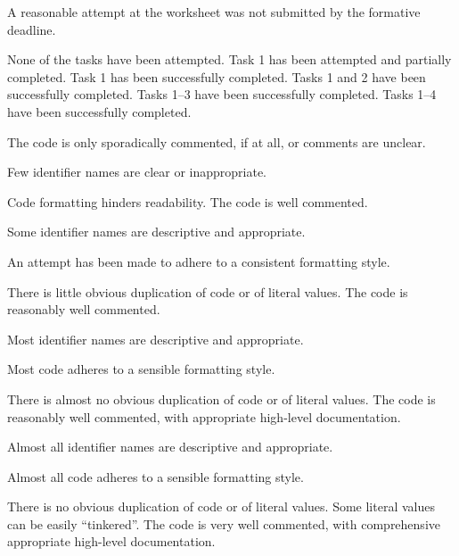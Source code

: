 \documentclass{../../../fal_assignment}
\begin{document}
\begin{markingrubric}
		\grade\fail	A reasonable attempt at the worksheet was not submitted by the formative deadline.
		
        \grade\fail None of the tasks have been attempted.
		\grade Task 1 has been attempted and partially completed.
		\grade Task 1 has been successfully completed.
		\grade Tasks 1 and 2 have been successfully completed.
		\grade Tasks 1--3 have been successfully completed.
		\grade Tasks 1--4 have been successfully completed.

        \grade \fail The code is only sporadically commented, if at all, or comments are unclear.
            \par Few identifier names are clear or inappropriate.
            \par Code formatting hinders readability.
        \grade The code is well commented.
            \par Some identifier names are descriptive and appropriate.
            \par An attempt has been made to adhere to a consistent formatting style.
             \par There is little obvious duplication of code or of literal values.           
        \grade The code is reasonably well commented.
            \par Most identifier names are descriptive and appropriate.
            \par Most code adheres to a sensible formatting style.
             \par There is almost no obvious duplication of code or of literal values.   
        \grade The code is reasonably well commented, with appropriate high-level documentation.
            \par Almost all identifier names are descriptive and appropriate.
            \par Almost all code adheres to a sensible formatting style.
             \par There is no obvious duplication of code or of literal values. Some literal values can be easily ``tinkered''. 
        \grade The code is very well commented, with comprehensive appropriate high-level documentation.

\end{markingrubric}
\end{document}
